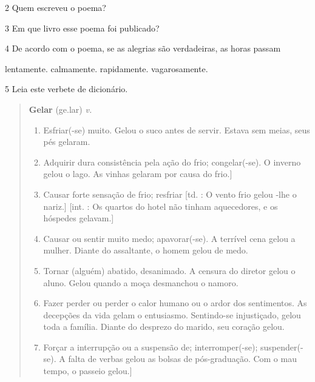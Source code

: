 
\num{2} Quem escreveu o poema?


\num{3} Em que livro esse poema foi publicado?


\num{4} De acordo com o poema, se as alegrias são verdadeiras, as horas passam

\begin{boxlist}
  \boxitem[] lentamente.
  \boxitem[] calmamente.
  \boxitem[X] rapidamente.
  \boxitem[] vagarosamente.
\end{boxlist}

\num{5} Leia este verbete de dicionário.

\begin{quote}
\textbf{Gelar} (ge.lar)
\textit{v.}

\begin{enumerate}
\item Esfriar(-se) muito.
Gelou o suco antes de servir.
Estava sem meias, seus pés gelaram.

\item Adquirir dura consistência pela ação do frio; congelar(-se).
O inverno gelou o lago.
As vinhas gelaram por causa do frio.]

\item Causar forte sensação de frio; resfriar [td. : O vento frio gelou -lhe o nariz.] [int. : Os quartos do hotel não tinham aquecedores, e os hóspedes gelavam.]

\item Causar ou sentir muito medo; apavorar(-se).
A terrível cena gelou a mulher.
Diante do assaltante, o homem gelou de medo.

\item Tornar (alguém) abatido, desanimado.
A censura do diretor gelou o aluno.
Gelou quando a moça desmanchou o namoro.

\item Fazer perder ou perder o calor humano ou o ardor dos sentimentos.
As decepções da vida gelam o entusiasmo.
Sentindo-se injustiçado, gelou toda a família.
Diante do desprezo do marido, seu coração gelou.

\item Forçar a interrupção ou a suspensão de; interromper(-se); suspender(-se).
A falta de verbas gelou as bolsas de pós-graduação.
Com o mau tempo, o passeio gelou.]
\end{enumerate}

\end{quote}


